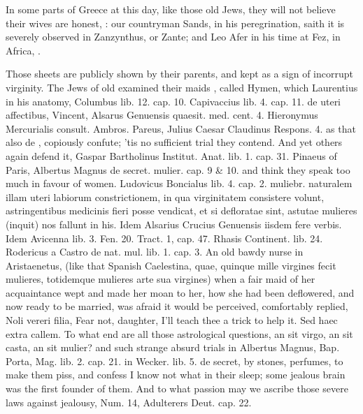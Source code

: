 In some parts of Greece at this day, like those old Jews, they will not believe
their wives are honest, : our
countryman Sands, in his peregrination, saith it is
severely observed in Zanzynthus, or Zante; and Leo Afer in his time at Fez, in
Africa, .

Those sheets are publicly shown by their parents, and kept as a sign of
incorrupt virginity. The Jews of old examined their maids , called Hymen, which Laurentius in his anatomy, Columbus lib.
12. cap. 10. Capivaccius lib. 4. cap. 11. de uteri affectibus, Vincent,
Alsarus Genuensis quaesit. med. cent. 4. Hieronymus Mercurialis
consult. Ambros. Pareus, Julius Caesar Claudinus Respons. 4. as that
also de , copiously confute; 'tis
no sufficient trial they contend. And yet others again defend it,
Gaspar Bartholinus Institut. Anat. lib. 1. cap. 31. Pinaeus of Paris,
Albertus Magnus de secret. mulier. cap. 9 \& 10. \etc{} and think they
speak too much in favour of women.  Ludovicus Boncialus lib. 4.
cap. 2. muliebr. naturalem illam uteri labiorum constrictionem, in qua
virginitatem consistere volunt, astringentibus medicinis fieri posse
vendicat, et si defloratae sint, astutae mulieres (inquit) nos
fallunt in his. Idem Alsarius Crucius Genuensis iisdem fere verbis.
Idem Avicenna lib. 3. Fen. 20. Tract. 1, cap. 47. Rhasis
Continent. lib. 24. Rodericus a Castro de nat. mul. lib. 1. cap. 3. An
old bawdy nurse in Aristaenetus, (like that Spanish Caelestina,
quae, quinque mille virgines fecit mulieres, totidemque mulieres
arte sua virgines) when a fair maid of her acquaintance wept and made
her moan to her, how she had been deflowered, and now ready to be
married, was afraid it would be perceived, comfortably replied, Noli
vereri filia, \etc{} Fear not, daughter, I'll teach thee a trick to help
it. Sed haec extra callem. To what end are all those astrological
questions, an sit virgo, an sit casta, an sit mulier? and such strange
absurd trials in Albertus Magnus, Bap. Porta, Mag. lib. 2. cap. 21. in
Wecker. lib. 5. de secret, by stones, perfumes, to make them piss, and
confess I know not what in their sleep; some jealous brain was the
first founder of them. And to what passion may we ascribe those severe
laws against jealousy, Num.  14, Adulterers Deut. cap. 22.  
